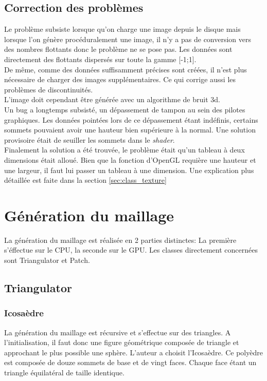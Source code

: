     \subsection{Correction des problèmes}
    Le problème subsiste lorsque qu'on charge une image depuis le disque mais lorsque l'on génère procéduralement une image,
    il n'y a pas de conversion vers des nombres flottants donc le problème ne se pose pas. Les données sont directement des flottants dispersés sur toute la gamme [-1;1].\\
    De même, comme des données suffisamment précises sont créées, il n'est plus nécessaire de charger des images supplémentaires. Ce qui corrige aussi les problèmes de discontinuités.\\
    L'image doit cependant être générée avec un algorithme de bruit 3d.\\
    
    Un bug a longtemps subsisté, un dépassement de tampon au sein des pilotes graphiques. 
    Les données pointées lors de ce dépassement étant indéfinis, certains sommets pouvaient avoir une hauteur bien supérieure à la normal. Une solution provisoire était de seuiller les sommets dans le \textit{shader}.\\
    Finalement la solution a été trouvée, le problème était qu'un tableau à deux dimensions était alloué.
    Bien que la fonction d'OpenGL requière une hauteur et une largeur, il faut lui passer un tableau à une dimension. Une explication plus détaillée est faite dans la section \ref{sec:class_texture}
    
   \section{Génération du maillage}	%
   La génération du maillage est réalisée en 2 parties distinctes: La première s'éffectue sur le CPU, la seconde sur le GPU. Les classes directement concernées sont Triangulator et Patch.
  \subsection{Triangulator}
	\subsubsection{Icosaèdre}
	\label{subsec:icosaèdre}
	
	La génération du maillage est récursive et s'effectue sur des triangles. A l'initialisation, il faut donc une figure géométrique composée de triangle et approchant le plus possible une sphère. L'auteur a choisit l'Icosaèdre. Ce polyèdre est composée de douze sommets de base et de vingt faces. Chaque face étant un triangle équilatéral de taille identique.
	
